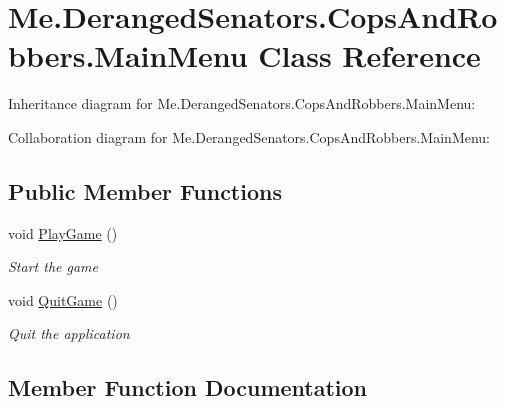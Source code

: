 \hypertarget{classMe_1_1DerangedSenators_1_1CopsAndRobbers_1_1MainMenu}{}\section{Me.\+Deranged\+Senators.\+Cops\+And\+Robbers.\+Main\+Menu Class Reference}
\label{classMe_1_1DerangedSenators_1_1CopsAndRobbers_1_1MainMenu}


Inheritance diagram for Me.\+Deranged\+Senators.\+Cops\+And\+Robbers.\+Main\+Menu\+:


Collaboration diagram for Me.\+Deranged\+Senators.\+Cops\+And\+Robbers.\+Main\+Menu\+:
\subsection*{Public Member Functions}
\begin{DoxyCompactItemize}
\item 
void \hyperlink{classMe_1_1DerangedSenators_1_1CopsAndRobbers_1_1MainMenu_a449b9b08264384753ab73bebb3fec56b}{Play\+Game} ()
\begin{DoxyCompactList}\small\item\em Start the game \end{DoxyCompactList}\item 
void \hyperlink{classMe_1_1DerangedSenators_1_1CopsAndRobbers_1_1MainMenu_a672493dace11db28e9278cb19fd44821}{Quit\+Game} ()
\begin{DoxyCompactList}\small\item\em Quit the application \end{DoxyCompactList}\end{DoxyCompactItemize}


\subsection{Member Function Documentation}
\mbox{\label{classMe_1_1DerangedSenators_1_1CopsAndRobbers_1_1MainMenu_a449b9b08264384753ab73bebb3fec56b}} 

